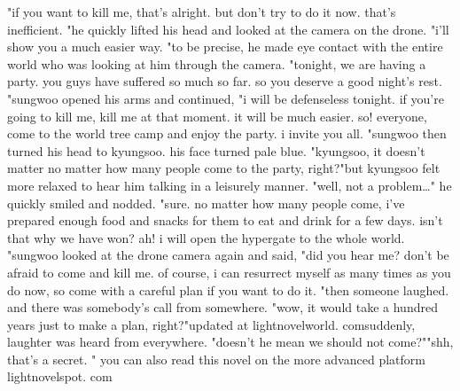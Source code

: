 "if you want to kill me, that's alright.
 but don't try to do it now.
 that's inefficient.
"he quickly lifted his head and looked at the camera on the drone.
"i'll show you a much easier way.
"to be precise, he made eye contact with the entire world who was looking at him through the camera.
"tonight, we are having a party.
 you guys have suffered so much so far.
 so you deserve a good night's rest.
"sungwoo opened his arms and continued, "i will be defenseless tonight.
 if you're going to kill me, kill me at that moment.
 it will be much easier.
 so! everyone, come to the world tree camp and enjoy the party.
 i invite you all.
"sungwoo then turned his head to kyungsoo.
 his face turned pale blue.
"kyungsoo, it doesn't matter no matter how many people come to the party, right?"but kyungsoo felt more relaxed to hear him talking in a leisurely manner.
"well, not a problem…" he quickly smiled and nodded.
"sure.
 no matter how many people come, i've prepared enough food and snacks for them to eat and drink for a few days.
 isn't that why we have won? ah! i will open the hypergate to the whole world.
"sungwoo looked at the drone camera again and said, "did you hear me? don't be afraid to come and kill me.
 of course, i can resurrect myself as many times as you do now, so come with a careful plan if you want to do it.
"then someone laughed.
 and there was somebody's call from somewhere.
"wow, it would take a hundred years just to make a plan, right?"updated at lightnov‌elworld.
comsuddenly, laughter was heard from everywhere.
"doesn't he mean we should not come?""shh, that's a secret.
" you can also read this novel on the more advanced platform lightnovelspot.
com

 
